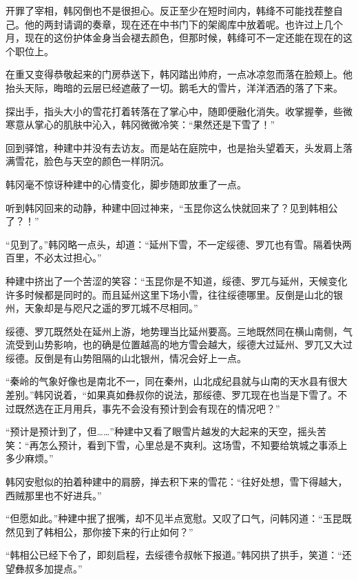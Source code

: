 开罪了宰相，韩冈倒也不是很担心。反正至少在短时间内，韩绛不可能找茬整自己。他的两封请调的奏章，现在还在中书门下的架阁库中放着呢。也许过上几个月，现在的这份护体金身当会褪去颜色，但那时候，韩绛可不一定还能在现在的这个职位上。

在重又变得恭敬起来的门房恭送下，韩冈踏出帅府，一点冰凉忽而落在脸颊上。他抬头天际，晦暗的云层已经遮蔽了一切。鹅毛大的雪片，洋洋洒洒的落了下来。

探出手，指头大小的雪花打着转落在了掌心中，随即便融化消失。收掌握拳，些微寒意从掌心的肌肤中沁入，韩冈微微冷笑：“果然还是下雪了！”

回到驿馆，种建中并没有去访友。而是站在庭院中，也是抬头望着天，头发肩上落满雪花，脸色与天空的颜色一样阴沉。

韩冈毫不惊讶种建中的心情变化，脚步随即放重了一点。

听到韩冈回来的动静，种建中回过神来，“玉昆你这么快就回来了？见到韩相公了？！”

“见到了。”韩冈略一点头，却道：“延州下雪，不一定绥德、罗兀也有雪。隔着快两百里，不必太过担心。”

种建中挤出了一个苦涩的笑容：“玉昆你是不知道，绥德、罗兀与延州，天候变化许多时候都是同时的。而且延州这里下场小雪，往往绥德哪里。反倒是山北的银州，天象却是与咫尺之遥的罗兀城不尽相同。”

绥德、罗兀既然处在延州上游，地势理当比延州要高。三地既然同在横山南侧，气流受到山势影响，也的确是位置越高的地方雪会越大，绥德大过延州、罗兀又大过绥德。反倒是有山势阻隔的山北银州，情况会好上一点。

“秦岭的气象好像也是南北不一，同在秦州，山北成纪县就与山南的天水县有很大差别。”韩冈说着，“如果真如彝叔你的说法，那绥德、罗兀现在也当是下雪了。不过既然选在正月用兵，事先不会没有预计到会有现在的情况吧？”

“预计是预计到了，但……”种建中又看了眼雪片越发的大起来的天空，摇头苦笑：“再怎么预计，看到下雪，心里总是不爽利。这场雪，不知要给筑城之事添上多少麻烦。”

韩冈安慰似的拍着种建中的肩膀，掸去积下来的雪花：“往好处想，雪下得越大，西贼那里也不好进兵。”

“但愿如此。”种建中抿了抿嘴，却不见半点宽慰。又叹了口气，问韩冈道：“玉昆既然见到了韩相公，那你接下来的行止如何？”

“韩相公已经下令了，即刻启程，去绥德令叔帐下报道。”韩冈拱了拱手，笑道：“还望彝叔多加提点。”

